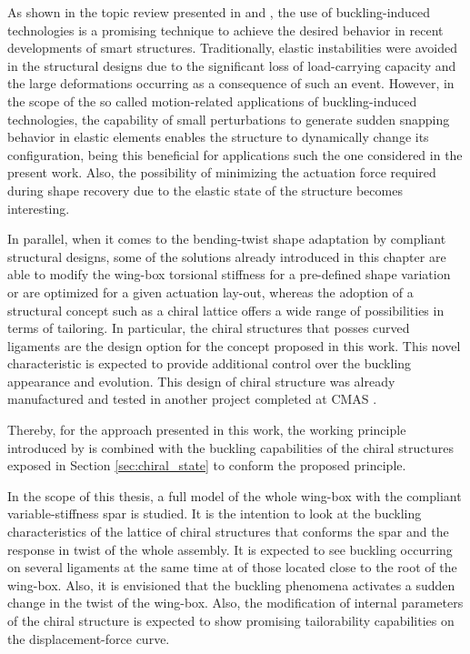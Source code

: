   As shown in the topic review presented in \cite{Hu2015} and \cite{Reis2015}, the use of buckling-induced technologies is a promising technique to achieve the desired behavior in recent developments of smart structures. Traditionally, elastic instabilities were avoided in the structural designs due to the significant loss of load-carrying capacity and the large deformations occurring as a consequence of such an event. However, in the scope of the so called motion-related applications of buckling-induced technologies, the capability of small perturbations to generate sudden snapping behavior in elastic elements enables the structure to dynamically change its configuration, being this beneficial for applications such the one considered in the present work. Also, the possibility of minimizing the actuation force required during shape recovery due to the elastic state of the structure becomes interesting.

  In parallel, when it comes to the bending-twist shape adaptation by compliant structural designs, some of the solutions already introduced in this chapter are able to modify the wing-box torsional stiffness for a pre-defined shape variation or are optimized for a given actuation lay-out, whereas the adoption of a structural concept such as a chiral lattice offers a wide range of possibilities in terms of tailoring. In particular, the chiral structures that posses curved ligaments are the design option for the concept proposed in this work. This novel characteristic is expected to provide additional control over the buckling appearance and evolution. This design of chiral structure was already manufactured and tested in another project completed at CMAS \cite{Vincenz2017}.

  Thereby, for the approach presented in this work, the working principle introduced by \cite{Raither2013a} is combined with the buckling capabilities of the chiral structures exposed in Section \ref{sec:chiral_state} to conform the proposed principle. 

  In the scope of this thesis, a full model of the whole wing-box with the compliant variable-stiffness spar is studied. It is the intention to look at the buckling characteristics of the lattice of chiral structures that conforms the spar and the response in twist of the whole assembly. It is expected to see buckling occurring on several ligaments at the same time at of those located close to the root of the wing-box. Also, it is envisioned that the buckling phenomena activates a sudden change in the twist of the wing-box. Also, the modification of internal parameters of the chiral structure is expected to show promising tailorability capabilities on the displacement-force curve.

